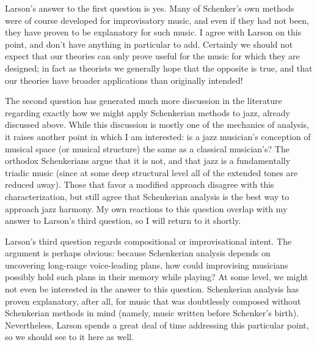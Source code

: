 \documentclass[diss]{subfiles}
\begin{document}
Larson’s answer to the first question is yes. Many of Schenker’s own methods
were of course developed for improvisatory music, and even if they had not
been, they have proven to be explanatory for such music. I agree
with Larson on this point, and don’t have anything in particular to add.
Certainly we should not expect that our theories can only prove useful for the
music for which they are designed; in fact as theorists we generally hope that
the opposite is true, and that our theories have broader applications than
originally intended!

The second question has generated much more discussion in the literature
regarding exactly how we might apply Schenkerian methods to jazz, already
discussed above. While this discussion is mostly one of the mechanics of
analysis, it raises another point in which I am interested: is a jazz
musician’s conception of musical space (or musical structure) the same as a
classical musician’s? The orthodox Schenkerians argue that it is not, and that
jazz is a fundamentally triadic music (since at some deep structural level all
of the extended tones are reduced away). Those that favor a modified approach
disagree with this characterization, but still agree that Schenkerian analysis
is the best way to approach jazz harmony. My own reactions to this question
overlap with my answer to Larson’s third question, so I will return to it
shortly.

Larson’s third question regards compositional or improvisational intent. The
argument is perhaps obvious: because Schenkerian analysis depends on
uncovering long-range voice-leading plans, how could improvising musicians
possibly hold such plans in their memory while playing? At some level, we
might not even be interested in the answer to this question. Schenkerian
analysis has proven explanatory, after all, for music that was doubtlessly
composed without Schenkerian methods in mind (namely, music written before
Schenker’s birth). Nevertheless, Larson spends a great deal of time addressing
this particular point, so we should see to it here as well.
\end{document}
